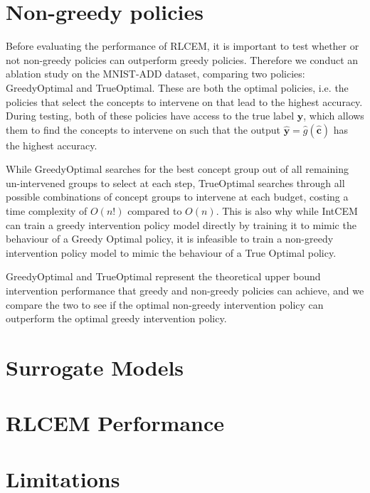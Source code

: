 \section{Non-greedy policies}

Before evaluating the performance of RLCEM, it is important to test whether or not 
non-greedy policies can outperform greedy policies. 
Therefore we conduct an
ablation study on the MNIST-ADD dataset, comparing two policies:
GreedyOptimal and TrueOptimal.
These are both the optimal policies,
i.e. the policies that select the concepts to intervene
on that lead to the highest accuracy. During 
testing, both of these policies have access to the true label $\mathbf{y}$, which 
allows them to find the concepts to intervene on 
such that the output
$\hat{\mathbf{y}} = \hat{g}(\hat{\mathbf{c}})$ 
has the highest accuracy.

While GreedyOptimal searches for the best concept group
out of all remaining un-intervened groups
to select at each step, TrueOptimal searches through
all possible combinations of concept groups to intervene at each budget, costing a time complexity of $O(n!)$ compared to
$O(n)$. This is also why while IntCEM can 
train a greedy intervention policy model directly
by training it to mimic the behaviour of a Greedy Optimal 
policy, it is infeasible to train a non-greedy intervention policy
model to mimic the behaviour of a True Optimal policy.

GreedyOptimal and TrueOptimal represent the theoretical
upper bound intervention performance
that greedy and non-greedy policies can achieve,
and we compare the two to see if the optimal 
non-greedy intervention policy can outperform the 
optimal greedy
intervention policy.


\section{Surrogate Models}

\section{RLCEM Performance}

\section{Limitations}

